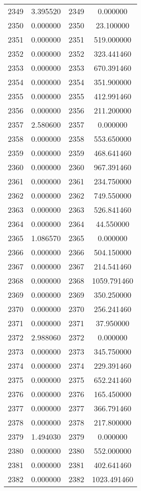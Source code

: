 \documentclass[12pt]{article}
\begin{document}
\begin{longtable}{@{}cccc@{}}
2349 & 3.395520 & 2349 & 0.000000 \\
2350 & 0.000000 & 2350 & 23.100000 \\
2351 & 0.000000 & 2351 & 519.000000 \\
2352 & 0.000000 & 2352 & 323.441460 \\
2353 & 0.000000 & 2353 & 670.391460 \\
2354 & 0.000000 & 2354 & 351.900000 \\
2355 & 0.000000 & 2355 & 412.991460 \\
2356 & 0.000000 & 2356 & 211.200000 \\
2357 & 2.580600 & 2357 & 0.000000 \\
2358 & 0.000000 & 2358 & 553.650000 \\
2359 & 0.000000 & 2359 & 468.641460 \\
2360 & 0.000000 & 2360 & 967.391460 \\
2361 & 0.000000 & 2361 & 234.750000 \\
2362 & 0.000000 & 2362 & 749.550000 \\
2363 & 0.000000 & 2363 & 526.841460 \\
2364 & 0.000000 & 2364 & 44.550000 \\
2365 & 1.086570 & 2365 & 0.000000 \\
2366 & 0.000000 & 2366 & 504.150000 \\
2367 & 0.000000 & 2367 & 214.541460 \\
2368 & 0.000000 & 2368 & 1059.791460 \\
2369 & 0.000000 & 2369 & 350.250000 \\
2370 & 0.000000 & 2370 & 256.241460 \\
2371 & 0.000000 & 2371 & 37.950000 \\
2372 & 2.988060 & 2372 & 0.000000 \\
2373 & 0.000000 & 2373 & 345.750000 \\
2374 & 0.000000 & 2374 & 229.391460 \\
2375 & 0.000000 & 2375 & 652.241460 \\
2376 & 0.000000 & 2376 & 165.450000 \\
2377 & 0.000000 & 2377 & 366.791460 \\
2378 & 0.000000 & 2378 & 217.800000 \\
2379 & 1.494030 & 2379 & 0.000000 \\
2380 & 0.000000 & 2380 & 552.000000 \\
2381 & 0.000000 & 2381 & 402.641460 \\
2382 & 0.000000 & 2382 & 1023.491460 \\

\end{longtable}
\end{document}

